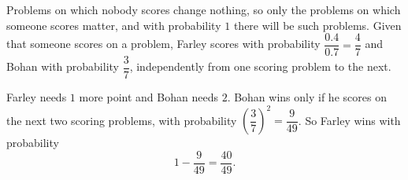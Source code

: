 Problems on which nobody scores change nothing, so only the problems on which someone scores matter, and with probability $1$ there will be such problems. Given that someone scores on a problem, Farley scores with probability $\dfrac{0.4}{0.7}=\dfrac47$ and Bohan with probability $\dfrac37$, independently from one scoring problem to the next.

Farley needs $1$ more point and Bohan needs $2$. Bohan wins only if he scores on the next two scoring problems, with probability $\left(\dfrac37\right)^2=\dfrac{9}{49}$. So Farley wins with probability
\[1-\dfrac{9}{49}=\boxed{\dfrac{40}{49}}.\]
